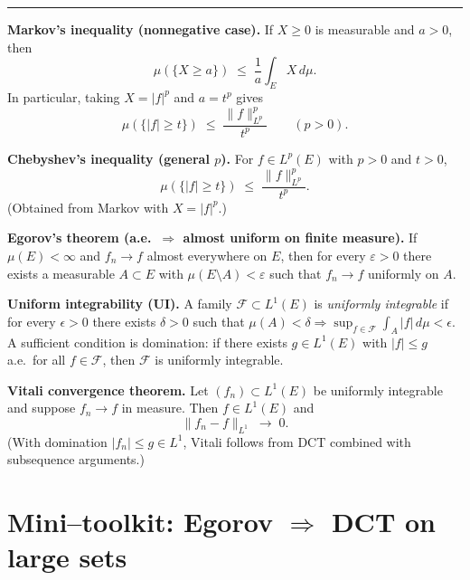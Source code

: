 \documentclass[12pt,a4paper]{article}
\theoremstyle{plain}
\theoremstyle{definition}
\theoremstyle{remark}
\theoremstyle{remark}
\newcommand{\tighthrule}{\vspace{0.6\baselineskip}\hrule\vspace{0.8\baselineskip}}
\newenvironment{spacy}{\begingroup\setlength{\parskip}{6pt}\setlength{\parindent}{0pt}}{\endgroup}
\theoremstyle{definition}
\begin{document}
\tighthrule
\begin{spacy}
	\textbf{Markov's inequality (nonnegative case).}
	If $X\ge0$ is measurable and $a>0$, then
	\[
	\mu(\{X\ge a\}) \;\le\; \frac{1}{a}\int_E X\,d\mu.
	\]
	In particular, taking $X=|f|^{p}$ and $a=t^{p}$ gives
	\[
	\mu(\{|f|\ge t\}) \;\le\; \frac{\|f\|_{L^{p}}^{p}}{t^{p}}\qquad (p>0).
	\]
	
	\medskip
	
	\textbf{Chebyshev's inequality (general $p$).}
	For $f\in L^{p}(E)$ with $p>0$ and $t>0$,
	\[
	\mu(\{|f|\ge t\}) \;\le\; \frac{\|f\|_{L^{p}}^{p}}{t^{p}}.
	\]
	(Obtained from Markov with $X=|f|^{p}$.)
	
	\medskip
	
	\textbf{Egorov's theorem (a.e.\ $\Rightarrow$ almost uniform on finite measure).}
	If $\mu(E)<\infty$ and $f_n\to f$ almost everywhere on $E$, then for every $\varepsilon>0$ there exists
	a measurable $A\subset E$ with $\mu(E\setminus A)<\varepsilon$ such that $f_n\to f$ uniformly on $A$.
	
	\medskip
	
	\textbf{Uniform integrability (UI).}
	A family $\mathcal F\subset L^{1}(E)$ is \emph{uniformly integrable} if
	for every $\epsilon>0$ there exists $\delta>0$ such that
	$\mu(A)<\delta \Rightarrow \sup_{f\in\mathcal F}\int_{A}|f|\,d\mu<\epsilon$.
	A sufficient condition is domination: if there exists $g\in L^{1}(E)$ with $|f|\le g$ a.e.\ for all $f\in\mathcal F$,
	then $\mathcal F$ is uniformly integrable.
	
	\medskip
	
	\textbf{Vitali convergence theorem.}
	Let $(f_n)\subset L^{1}(E)$ be uniformly integrable and suppose $f_n\to f$ in measure.
	Then $f\in L^{1}(E)$ and
	\[
	\|f_n-f\|_{L^{1}} \;\longrightarrow\; 0 .
	\]
	(With domination $|f_n|\le g\in L^{1}$, Vitali follows from DCT combined with subsequence arguments.)
	
\end{spacy}

\section*{Mini–toolkit: Egorov $\Rightarrow$ DCT on large sets}
\end{document}
